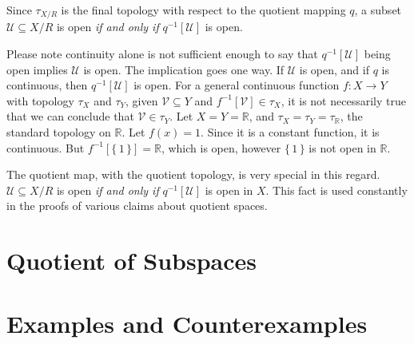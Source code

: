 \documentclass{article}
\theoremstyle{plain}
\theoremstyle{normal}
\begin{document}
        Since $\tau_{X/R}$ is the final topology with respect to the quotient
        mapping $q$, a subset $\mathcal{U}\subseteq{X}/R$ is open
        \textit{if and only if} $q^{-1}[\mathcal{U}]$ is open.
        \par\hfill\par
        Please note continuity alone is not sufficient enough to say that
        $q^{-1}[\mathcal{U}]$ being open implies $\mathcal{U}$ is open. The
        implication goes one way. If $\mathcal{U}$ is open, and if $q$ is
        continuous, then $q^{-1}[\mathcal{U}]$ is open. For a general continuous
        function $f:X\rightarrow{Y}$ with topology $\tau_{X}$ and $\tau_{Y}$,
        given $\mathcal{V}\subseteq{Y}$ and $f^{-1}[\mathcal{V}]\in\tau_{X}$, it
        is not necessarily true that we can conclude that
        $\mathcal{V}\in\tau_{Y}$. Let $X=Y=\mathbb{R}$, and
        $\tau_{X}=\tau_{Y}=\tau_{\mathbb{R}}$, the standard topology on
        $\mathbb{R}$. Let $f(x)=1$. Since it is a constant function, it is
        continuous. But $f^{-1}[\{\,1\,\}]=\mathbb{R}$, which is open, however
        $\{\,1\,\}$ is not open in $\mathbb{R}$.
        \par\hfill\par
        The quotient map, with the quotient topology, is very special in this
        regard. $\mathcal{U}\subseteq{X}/R$ is open \textit{if and only if}
        $q^{-1}[\mathcal{U}]$ is open in $X$. This fact is used constantly in
        the proofs of various claims about quotient spaces.
    \section{Quotient of Subspaces}
    \section{Examples and Counterexamples}
\end{document}
